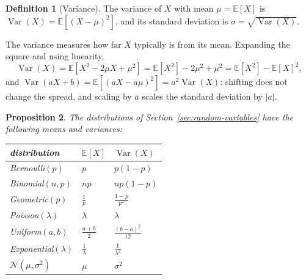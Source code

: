 \documentclass[11pt]{article}
\newcommand{\E}{\mathbb{E}}
\DeclareMathOperator{\Var}{Var}
\theoremstyle{definition}
\newtheorem{definition}{Definition}[section]
\theoremstyle{plain}
\newtheorem{proposition}[definition]{Proposition}
\theoremstyle{remark}
\begin{document}
\begin{definition}[Variance]\label{def:variance}
    The variance of $X$ with mean $\mu = \E[X]$ is $\Var(X) = \E[(X - \mu)^2]$, and its standard deviation is $\sigma = \sqrt{\Var(X)}$.
\end{definition}

The variance measures how far $X$ typically is from its mean. Expanding the square and using linearity,
\[\Var(X) = \E[X^2 - 2\mu X + \mu^2] = \E[X^2] - 2\mu^2 + \mu^2 = \E[X^2] - \E[X]^2,\]
and $\Var(aX + b) = \E[(aX - a\mu)^2] = a^2\Var(X)$: shifting does not change the spread, and scaling by $a$ scales the standard deviation by $|a|$.

\begin{proposition}\label{prop:moments}
    The distributions of Section~\ref{sec:random-variables} have the following means and variances:
    \begin{center}
        \renewcommand{\arraystretch}{1.3}
        \begin{tabular}{lll}
            \hline
            distribution & $\E[X]$ & $\Var(X)$ \\
            \hline
            Bernoulli$(p)$ & $p$ & $p(1 - p)$ \\
            Binomial$(n, p)$ & $np$ & $np(1 - p)$ \\
            Geometric$(p)$ & $\frac{1}{p}$ & $\frac{1 - p}{p^2}$ \\
            Poisson$(\lambda)$ & $\lambda$ & $\lambda$ \\
            Uniform$(a, b)$ & $\frac{a + b}{2}$ & $\frac{(b - a)^2}{12}$ \\
            Exponential$(\lambda)$ & $\frac{1}{\lambda}$ & $\frac{1}{\lambda^2}$ \\
            $\mathcal{N}(\mu, \sigma^2)$ & $\mu$ & $\sigma^2$ \\
            \hline
        \end{tabular}
    \end{center}
\end{proposition}
\end{document}

